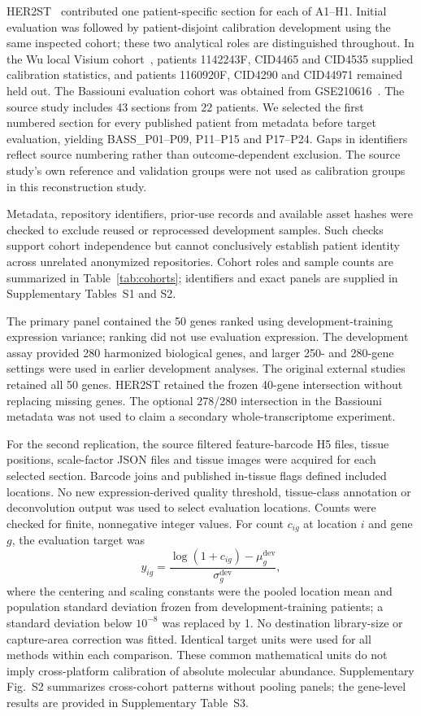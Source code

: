 HER2ST~\cite{andersson2021} contributed one patient-specific section for each of A1--H1. Initial evaluation was followed by patient-disjoint calibration development using the same inspected cohort; these two analytical roles are distinguished throughout. In the Wu local Visium cohort~\cite{wu2021}, patients 1142243F, CID4465 and CID4535 supplied calibration statistics, and patients 1160920F, CID4290 and CID44971 remained held out. The Bassiouni evaluation cohort was obtained from GSE210616~\cite{bassiouni2023}. The source study includes 43 sections from 22 patients. We selected the first numbered section for every published patient from metadata before target evaluation, yielding BASS\_P01--P09, P11--P15 and P17--P24. Gaps in identifiers reflect source numbering rather than outcome-dependent exclusion. The source study's own reference and validation groups were not used as calibration groups in this reconstruction study.

Metadata, repository identifiers, prior-use records and available asset hashes were checked to exclude reused or reprocessed development samples. Such checks support cohort independence but cannot conclusively establish patient identity across unrelated anonymized repositories. Cohort roles and sample counts are summarized in Table~\ref{tab:cohorts}; identifiers and exact panels are supplied in Supplementary Tables~S1 and S2.

The primary panel contained the 50 genes ranked using development-training expression variance; ranking did not use evaluation expression. The development assay provided 280 harmonized biological genes, and larger 250- and 280-gene settings were used in earlier development analyses. The original external studies retained all 50 genes. HER2ST retained the frozen 40-gene intersection without replacing missing genes. The optional 278/280 intersection in the Bassiouni metadata was not used to claim a secondary whole-transcriptome experiment.

For the second replication, the source filtered feature-barcode H5 files, tissue positions, scale-factor JSON files and tissue images were acquired for each selected section. Barcode joins and published in-tissue flags defined included locations. No new expression-derived quality threshold, tissue-class annotation or deconvolution output was used to select evaluation locations. Counts were checked for finite, nonnegative integer values. For count $c_{ig}$ at location $i$ and gene $g$, the evaluation target was
\begin{equation}
 y_{ig}=\frac{\log(1+c_{ig})-\mu_g^{\mathrm{dev}}}{\sigma_g^{\mathrm{dev}}},
 \label{eq:target}
\end{equation}
where the centering and scaling constants were the pooled location mean and population standard deviation frozen from development-training patients; a standard deviation below $10^{-8}$ was replaced by 1. No destination library-size or capture-area correction was fitted. Identical target units were used for all methods within each comparison. These common mathematical units do not imply cross-platform calibration of absolute molecular abundance. Supplementary Fig.~S2 summarizes cross-cohort patterns without pooling panels; the gene-level results are provided in Supplementary Table~S3.


